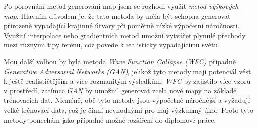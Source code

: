 Po porovnání metod generování map jsem se rozhodl využít \textit{metod výškových map}. Hlavním důvodem je, že tato metoda by měla být schopna generovat přirozeně vypadající krajinné útvary při poměrně nízké výpočetní náročnosti. Využití interpolace nebo gradientních metod umožní vytvářet plynulé přechody mezi různými tipy terénu, což povede k realisticky vypadajícímu světu.

Mou další volbou by byla metoda \textit{Wave Function Collapse (WFC)} případně \textit{Generative Adversarial Networks (GAN)}, jelikož tyto metody mají potenciál vést k ještě realističtějším a více rozmanitým výsledkům. \textit{WFC} by zajistilo více vzorů v prostředí, zatímco \textit{GAN} by umožnil generovat zcela nové mapy na základě trénovacích dat. Nicméně, obě tyto metody jsou výpočetně náročnější a vyžadují velké trénovací data, což je činní nevhodnými pro můj výzkumný úkol. Proto tyto metody ponechám jako případné možné rozšíření do diplomové práce.